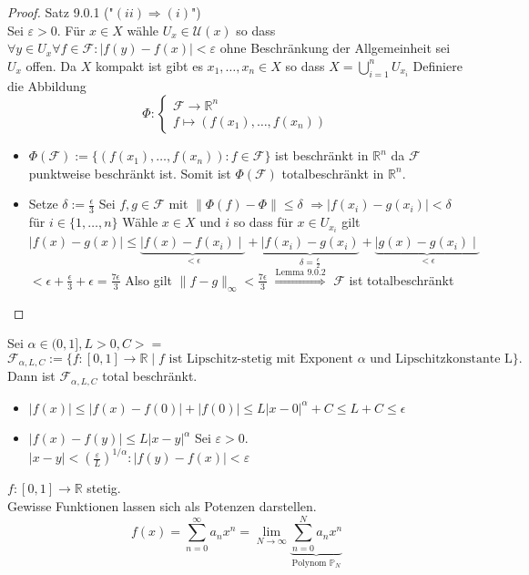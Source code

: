 \begin{proof}{Satz 9.0.1 ("$(ii) \Rightarrow (i)$")}\\
    Sei $\varepsilon > 0$. Für $x \in X$ wähle $ U_x \in \mathcal{U}(x)$ so dass
    $\forall y \in U_x \forall f \in \mathscr{F}: |f(y) - f(x)| < \varepsilon$
    ohne Beschränkung der Allgemeinheit sei $U_x$ offen.
    Da $X$ kompakt ist gibt es $x_1, \ldots, x_n \in X$ so dass
    $X = \bigcup_{i=1}^{n} U_{x_i}$
    Definiere die Abbildung
    $$ 
    \Phi:\begin{cases}
         \mathscr{F} \to \mathbb{R}^n\\
        f \mapsto (f(x_1), \ldots, f(x_n))
    \end{cases}
    $$
    \begin{itemize}
        \item $\Phi(\mathscr{F}):= \{(f(x_1), \ldots, f(x_n)) : f \in \mathscr{F}\}$
        ist beschränkt in $\mathbb{R}^n$ da $\mathscr{F}$ punktweise beschränkt ist.
        Somit ist $\Phi(\mathscr{F})$ totalbeschränkt in $\mathbb{R}^n$.
        \item Setze $\delta := \frac{\epsilon}{3}$
        Sei $f,g \in \mathscr{F}$ mit $\|\Phi(f)-\Phi\|\leq \delta$
        $\Rightarrow |f(x_i) - g(x_i)| < \delta$ für $i \in \{1, \ldots, n\}$
        Wähle $x \in X$ und $i$ so dass für $x \in U_{x_i}$ gilt 
        $\mid f(x) - g(x) \mid \leq 
        \underbrace{\mid f(x)-f(x_i)\mid}_{< \epsilon} 
        + \underbrace{\mid f(x_i)-g(x_i)}_{\delta = \frac{\epsilon}{2}}
        +\underbrace{\mid g(x)-g(x_i)\mid}_{< \epsilon}$
        $< \epsilon + \frac{\epsilon}{3} + \epsilon = \frac{7\epsilon}{3}$
        Also gilt $\|f-g\|_{\infty} < \frac{7\epsilon}{3}$ 
        $\overset{\text{Lemma 9.0.2}}{\Rightarrow}$ $\mathscr{F}$ ist totalbeschränkt
    \end{itemize}
\end{proof}

\ex{}
{
    Sei $\alpha \in (0,1], L>0, C>=$
    $$
    \mathcal{F}_{\alpha,L,C}:= \{ f : [0,1] \to \mathbb{R}
    \mid f \text{ ist Lipschitz-stetig mit Exponent } \alpha 
    \text{ und Lipschitzkonstante L}\}.
    $$
    Dann ist $\mathcal{F}_{\alpha,L,C}$ total beschränkt.
    \begin{itemize}
        \item $|f(x)| \leq |f(x)-f(0)| + |f(0)| \leq L|x-0|^\alpha + C \leq L+C \leq \epsilon$
        \item $|f(x)-f(y)| \leq L|x-y|^{\alpha}$ Sei $\varepsilon > 0$. 
        $|x-y| < \left(\frac{\varepsilon}{L}\right)^{1/\alpha}: |f(y)-f(x)| < \varepsilon$
    \end{itemize}
    $f:[0,1] \to \mathbb{R}$ stetig.\\
    Gewisse Funktionen lassen sich als Potenzen darstellen.
    $$
    f(x) = \sum_{n=0}^{\infty} a_n x^n = \lim_{N \to \infty} 
    \underbrace{\sum_{n=0}^{N} a_n x^n}_{\text{Polynom }\mathbb{P}_N}
    $$
}


